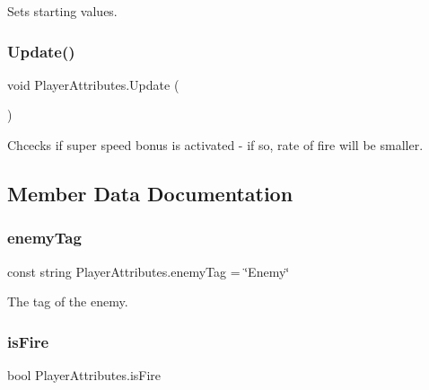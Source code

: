 Sets starting values. 

\mbox{\label{class_player_attributes_a5b1eb70086158522067e99f7900b679c}} 
\subsubsection{\texorpdfstring{Update()}{Update()}}
{\footnotesize\ttfamily void Player\+Attributes.\+Update (\begin{DoxyParamCaption}{ }\end{DoxyParamCaption})\hspace{0.3cm}{\ttfamily [private]}}



Chcecks if super speed bonus is activated -\/ if so, rate of fire will be smaller. 



\subsection{Member Data Documentation}
\mbox{\label{class_player_attributes_ada16579515985aa8211ab7ab641d7fd1}} 
\subsubsection{\texorpdfstring{enemy\+Tag}{enemyTag}}
{\footnotesize\ttfamily const string Player\+Attributes.\+enemy\+Tag = \char`\"{}Enemy\char`\"{}\hspace{0.3cm}{\ttfamily [private]}}



The tag of the enemy. 

\mbox{\label{class_player_attributes_a4bb2a3a44344d0e8e05ffd3c02b5e66c}} 
\subsubsection{\texorpdfstring{is\+Fire}{isFire}}
{\footnotesize\ttfamily bool Player\+Attributes.\+is\+Fire}



